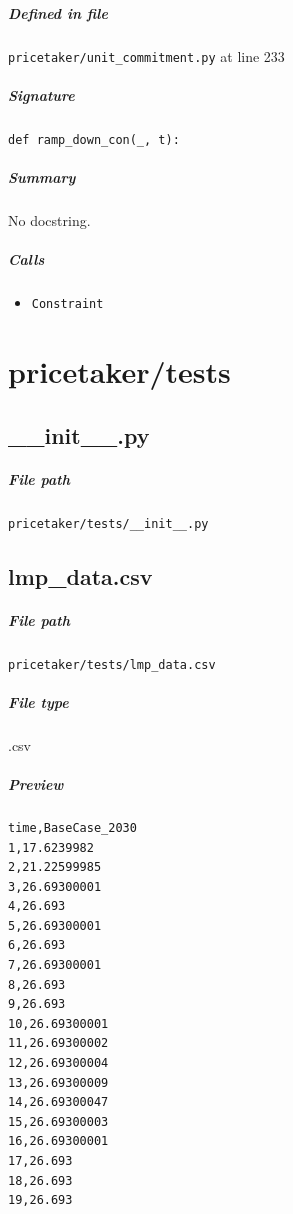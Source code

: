 \documentclass[11pt]{report}
\begin{document}
\paragraph{Defined in file} \texttt{pricetaker/unit\_commitment.py} at line 233
\paragraph{Signature} \texttt{def ramp\_down\_con(\_, t):}
\paragraph{Summary} No docstring.
\paragraph{Calls}
\begin{itemize}[leftmargin=*]
  \item \texttt{Constraint}
\end{itemize}

\chapter{pricetaker/tests}
\section{\_\_init\_\_.py}
\label{file:pricetaker-tests-__init__.py}
\paragraph{File path} \texttt{pricetaker/tests/\_\_init\_\_.py}

\section{lmp\_data.csv}
\label{file:pricetaker-tests-lmp_data.csv}
\paragraph{File path} \texttt{pricetaker/tests/lmp\_data.csv}
\paragraph{File type} .csv
\paragraph{Preview}
\begin{verbatim}
﻿time,BaseCase_2030
1,17.6239982
2,21.22599985
3,26.69300001
4,26.693
5,26.69300001
6,26.693
7,26.69300001
8,26.693
9,26.693
10,26.69300001
11,26.69300002
12,26.69300004
13,26.69300009
14,26.69300047
15,26.69300003
16,26.69300001
17,26.693
18,26.693
19,26.693
\end{verbatim}
\end{document}
